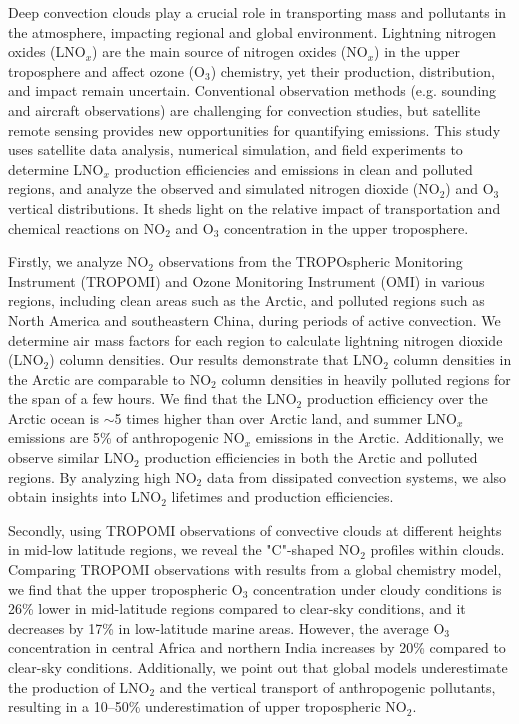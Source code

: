 {
Deep convection clouds play a crucial role in transporting mass and pollutants in the atmosphere, impacting regional and global environment.
Lightning nitrogen oxides (LNO$_x$) are the main source of nitrogen oxides (NO$_x$) in the upper troposphere
and affect ozone (O$_3$) chemistry, yet their production, distribution, and impact remain uncertain.
Conventional observation methods (e.g. sounding and aircraft observations) are challenging for convection studies,
but satellite remote sensing provides new opportunities for quantifying emissions.
This study uses satellite data analysis, numerical simulation, and field experiments to determine LNO$_x$ production efficiencies and emissions in clean and polluted regions,
and analyze the observed and simulated nitrogen dioxide (NO$_2$) and O$_3$ vertical distributions.
It sheds light on the relative impact of transportation and chemical reactions on NO$_2$ and O$_3$ concentration in the upper troposphere.

Firstly, we analyze NO$_2$ observations from the TROPOspheric Monitoring Instrument (TROPOMI) and
Ozone Monitoring Instrument (OMI) in various regions, including clean areas such as the Arctic, and polluted regions such as North America and southeastern China, during periods of active convection.
We determine air mass factors for each region to calculate lightning nitrogen dioxide (LNO$_2$) column densities.
Our results demonstrate that LNO$_2$ column densities in the Arctic are comparable to NO$_2$ column densities in heavily polluted regions for the span of a few hours.
We find that the LNO$_2$ production efficiency over the Arctic ocean is $\sim$5 times higher than over Arctic land, and summer LNO$_x$ emissions are 5\% of anthropogenic NO$_x$ emissions in the Arctic.
Additionally, we observe similar LNO$_2$ production efficiencies in both the Arctic and polluted regions.
By analyzing high NO$_2$ data from dissipated convection systems, we also obtain insights into LNO$_2$ lifetimes and production efficiencies.

Secondly, using TROPOMI observations of convective clouds at different heights in mid-low latitude regions, we reveal the "C"-shaped NO$_2$ profiles within clouds.
Comparing TROPOMI observations with results from a global chemistry model, we find that the upper tropospheric O$_3$ concentration under cloudy conditions is 26\% lower in mid-latitude regions compared to clear-sky conditions, and it decreases by 17\% in low-latitude marine areas.
However, the average O$_3$ concentration in central Africa and northern India increases by 20\% compared to clear-sky conditions.
Additionally, we point out that global models underestimate the production of LNO$_2$ and the vertical transport of anthropogenic pollutants, resulting in a 10--50\% underestimation of upper tropospheric NO$_2$.

}
